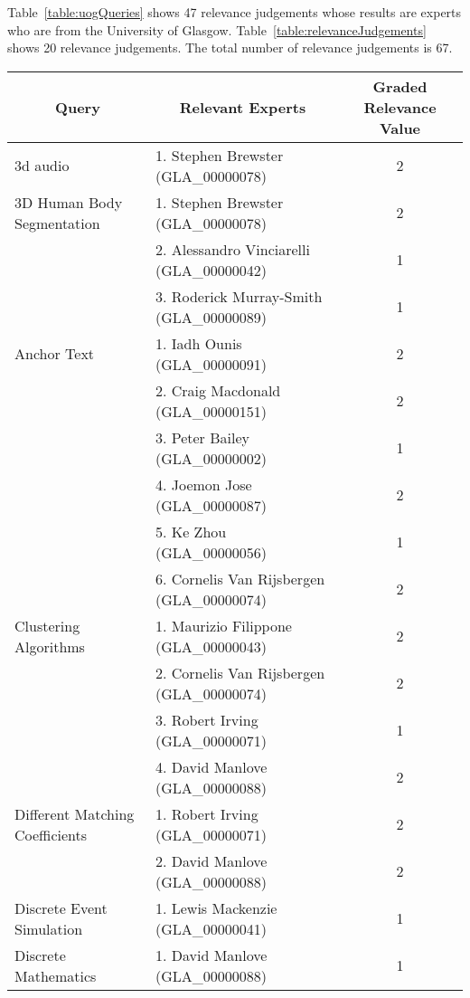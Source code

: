 

Table~\ref{table:uogQueries} shows 47 relevance judgements whose results are experts who are from the University of Glasgow.
Table~\ref{table:relevanceJudgements} shows 20 relevance judgements. The total number of relevance judgements is 67.

\footnotesize
\begin{longtable}{|l|l|c|}

\hline \multicolumn{1}{|c|}{\textbf{Query}} & \multicolumn{1}{|c|}{\textbf{Relevant Experts}} & \multicolumn{1}{|c|}{\textbf{Graded Relevance Value}} \\
\hline 3d audio & 1. Stephen Brewster (GLA\_00000078) & 2 \\
\hline 3D Human Body Segmentation & 1. Stephen Brewster (GLA\_00000078) & 2\\
\hline  & 2. Alessandro Vinciarelli (GLA\_00000042) & 1 \\
\hline  & 3. Roderick Murray-Smith (GLA\_00000089) & 1 \\  
\hline Anchor Text & 1. Iadh Ounis (GLA\_00000091) & 2 \\ 
\hline  & 2. Craig Macdonald (GLA\_00000151) & 2 \\ 
\hline  & 3. Peter Bailey (GLA\_00000002) & 1 \\ 
\hline  & 4. Joemon Jose (GLA\_00000087) & 2 \\ 
\hline  & 5. Ke Zhou (GLA\_00000056) & 1 \\ 
\hline  & 6. Cornelis Van Rijsbergen (GLA\_00000074) & 2 \\ 
\hline Clustering Algorithms & 1. Maurizio Filippone (GLA\_00000043) & 2 \\ 
\hline  & 2. Cornelis Van Rijsbergen (GLA\_00000074) & 2 \\ 
\hline  & 3. Robert Irving (GLA\_00000071) & 1 \\ 
\hline  & 4. David Manlove (GLA\_00000088) & 2 \\ 
\hline Different Matching Coefficients & 1. Robert Irving (GLA\_00000071) & 2 \\ 
\hline  & 2. David Manlove (GLA\_00000088) & 2 \\ 
\hline Discrete Event Simulation & 1. Lewis Mackenzie (GLA\_00000041) & 1 \\ 
\hline Discrete Mathematics & 1. David Manlove (GLA\_00000088) & 1 \\ 

\end{longtable}
